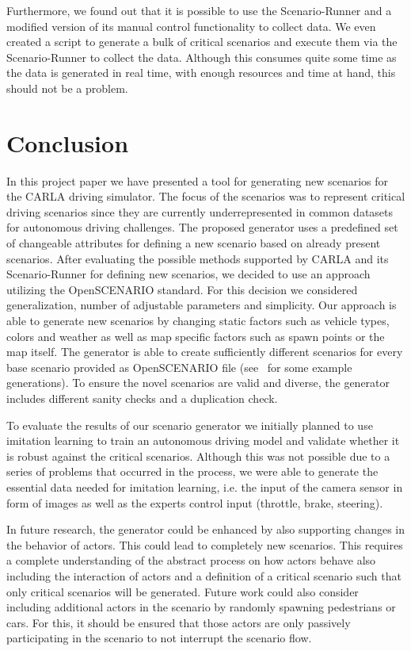 \documentclass[conference, a4paper, 11pt]{IEEEtran}
\begin{document}
Furthermore, we found out that it is possible to use the Scenario-Runner and a modified version of its manual control functionality to collect data. We even created a script to generate a bulk of critical scenarios and execute them via the Scenario-Runner to collect the data.
Although this consumes quite some time as the data is generated in real time, with enough resources and time at hand, this should not be a problem.

\section{Conclusion}
In this project paper we have presented a tool for generating new scenarios for the CARLA driving simulator. The focus of the scenarios was to represent critical driving scenarios since they are currently underrepresented in common datasets for autonomous driving challenges.
The proposed generator uses a predefined set of changeable attributes for defining a new scenario based on already present scenarios. After evaluating the possible methods supported by CARLA and its Scenario-Runner for defining new scenarios, we decided to use an approach utilizing the OpenSCENARIO standard. For this decision we considered generalization, number of adjustable parameters and simplicity. Our approach is able to generate new scenarios by changing static factors such as vehicle types, colors and weather as well as map specific factors such as spawn points or the map itself. The generator is able to create sufficiently different scenarios for every base scenario provided as OpenSCENARIO file (see  for some example generations). To ensure the novel scenarios are valid and diverse, the generator includes different sanity checks and a duplication check.

To evaluate the results of our scenario generator we initially planned to use imitation learning to train an autonomous driving model and validate whether it is robust against the critical scenarios. Although this was not possible due to a series of problems that occurred in the process, we were able to generate the essential data needed for imitation learning, i.e. the input of the camera sensor in form of images as well as the experts control input (throttle, brake, steering).

In future research, the generator could be enhanced by also supporting changes in the behavior of actors. This could lead to completely new scenarios. This requires a complete understanding of the abstract process on how actors behave also including the interaction of actors and a definition of a critical scenario such that only critical scenarios will be generated.
Future work could also consider including additional actors in the scenario by randomly spawning pedestrians or cars. For this, it should be ensured that those actors are only passively participating in the scenario to not interrupt the scenario flow.
\end{document}
